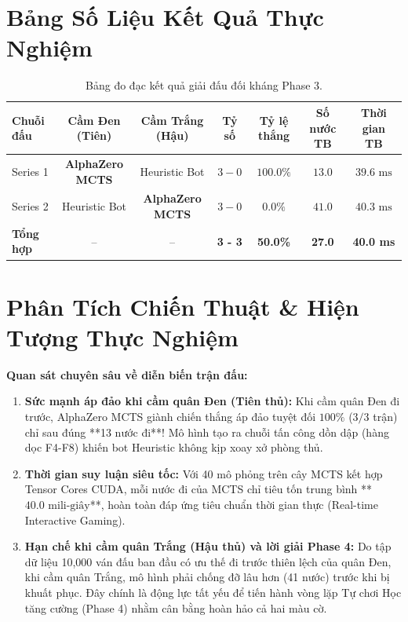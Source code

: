\documentclass[12pt,a4paper,oneside]{report}
\begin{document}
\section{Bảng Số Liệu Kết Quả Thực Nghiệm}

\begin{table}[htbp]
\centering
\caption{Bảng đo đạc kết quả giải đấu đối kháng Phase 3.}
\label{tab:tournament_results}
\begin{tabular}{lcccccc}
\toprule
\textbf{Chuỗi đấu} & \textbf{Cầm Đen (Tiên)} & \textbf{Cầm Trắng (Hậu)} & \textbf{Tỷ số} & \textbf{Tỷ lệ thắng} & \textbf{Số nước TB} & \textbf{Thời gian TB}\\
\midrule
Series 1 & \textbf{AlphaZero MCTS} & Heuristic Bot & $3 - 0$ & $\mathbf{100.0\%}$ & $13.0$ & $39.6\text{ ms}$\\
Series 2 & Heuristic Bot & \textbf{AlphaZero MCTS} & $3 - 0$ & $0.0\%$ & $41.0$ & $40.3\text{ ms}$\\
\midrule
\textbf{Tổng hợp} & -- & -- & \textbf{3 - 3} & \textbf{50.0\%} & \textbf{27.0} & \textbf{40.0 ms}\\
\bottomrule
\end{tabular}
\end{table}

\section{Phân Tích Chiến Thuật \& Hiện Tượng Thực Nghiệm}

\begin{pedagogy}
\textbf{Quan sát chuyên sâu về diễn biến trận đấu:}
\begin{enumerate}
    \item \textbf{Sức mạnh áp đảo khi cầm quân Đen (Tiên thủ):} Khi cầm quân Đen đi trước, AlphaZero MCTS giành chiến thắng áp đảo tuyệt đối $100\%$ ($3/3$ trận) chỉ sau đúng **13 nước đi**! Mô hình tạo ra chuỗi tấn công dồn dập (hàng dọc F4-F8) khiến bot Heuristic không kịp xoay xở phòng thủ.
    \item \textbf{Thời gian suy luận siêu tốc:} Với 40 mô phỏng trên cây MCTS kết hợp Tensor Cores CUDA, mỗi nước đi của MCTS chỉ tiêu tốn trung bình **$40.0\text{ mili-giây}$**, hoàn toàn đáp ứng tiêu chuẩn thời gian thực (Real-time Interactive Gaming).
    \item \textbf{Hạn chế khi cầm quân Trắng (Hậu thủ) và lời giải Phase 4:} Do tập dữ liệu 10,000 ván đấu ban đầu có ưu thế đi trước thiên lệch của quân Đen, khi cầm quân Trắng, mô hình phải chống đỡ lâu hơn (41 nước) trước khi bị khuất phục. Đây chính là động lực tất yếu để tiến hành vòng lặp Tự chơi Học tăng cường (Phase 4) nhằm cân bằng hoàn hảo cả hai màu cờ.
\end{enumerate}
\end{pedagogy}
\end{document}
